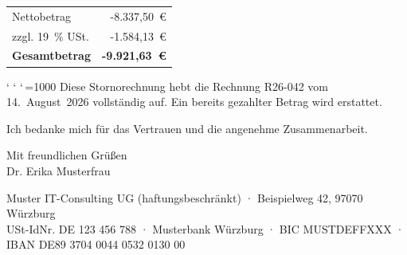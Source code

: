 \documentclass[11pt,a4paper]{article}
\newlength{\summenabstand}\setlength{\summenabstand}{1mm}
\newcommand{\summentrenner}{\\[\summenabstand]}
\newcommand{\zusammen}[1]{\mbox{#1}}
\newcommand{\hinweisabsatz}[1]{\par\vspace{6mm}\noindent%
  {\nonfrenchspacing\sfcode`\:=1000 \sfcode`\;=1000 \sfcode`\,=1000 #1}}
\newcommand{\summenzeile}[2]{#1 & #2}
\newcommand{\abschlusszeile}[2]{\\\midrule\textbf{#1} & \textbf{#2}}
\begin{document}
\hfill
\begin{minipage}{0.55\linewidth}
  \begin{tabularx}{\linewidth}{@{}>{\raggedright\arraybackslash}X r@{}}
  \summenzeile{Nettobetrag}{-8.337,50~€} \summentrenner{}
  \summenzeile{zzgl. 19~\% USt.}{-1.584,13~€}
  \abschlusszeile{Gesamtbetrag}{-9.921,63~€}
  \end{tabularx}
\end{minipage}

\hinweisabsatz{Diese Stornorechnung hebt die Rechnung \zusammen{R26-042} vom \zusammen{14.~August 2026} vollständig auf. Ein bereits gezahlter Betrag wird erstattet.}

\vspace{6mm}





\vspace{5mm}

Ich bedanke mich für das Vertrauen und die angenehme Zusammenarbeit.

\vspace{5mm}

Mit freundlichen Grüßen\\[7mm]
Dr. Erika Musterfrau



\vfill

{\centering\scriptsize\color{gedaempft}
Muster IT-Consulting UG (haftungsbeschränkt) · Beispielweg 42, 97070 Würzburg\\
USt-IdNr. DE 123 456 788 · Musterbank Würzburg · BIC MUSTDEFFXXX · IBAN DE89 3704 0044 0532 0130 00\par}
\end{document}
